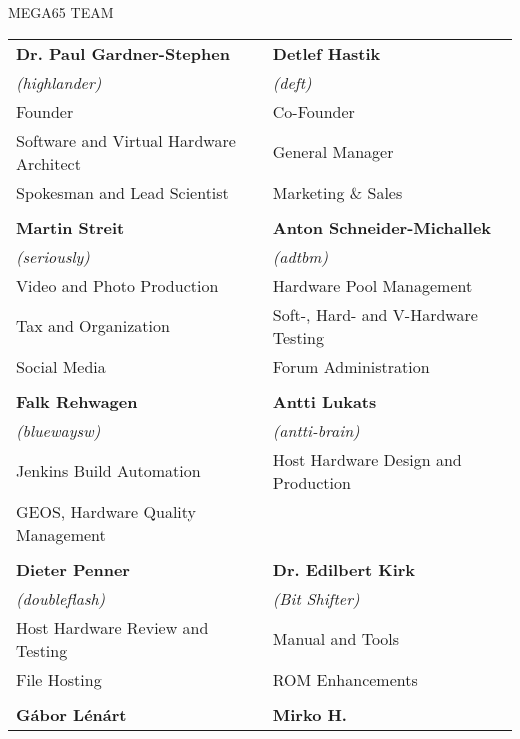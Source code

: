 \newpage
{\huge MEGA65 TEAM}\vspace{1cm}

\setlength{\tabcolsep}{1mm}
\begin{tabular}{ll}

{\large\bf Dr. Paul Gardner-Stephen}    & {\large\bf Detlef Hastik} \\
\textit{(highlander)}                   & \textit{(deft)} \\
Founder                                 & Co-Founder \\
Software and Virtual Hardware Architect & General Manager \\
Spokesman and Lead Scientist            & Marketing \& Sales \\
& \\
{\large\bf Martin Streit}               & {\large\bf Anton Schneider-Michallek} \\
 \textit{(seriously)}                   & \textit{(adtbm)} \\
Video and Photo Production              & Hardware Pool Management \\
Tax and Organization                    & Soft-, Hard- and V-Hardware Testing \\
Social Media                            & Forum Administration \\
& \\
{\large\bf Falk Rehwagen}               & {\large\bf Antti Lukats} \\
 \textit{(bluewaysw)}                   & \textit{(antti-brain)} \\
Jenkins Build Automation                & Host Hardware Design and Production \\
GEOS, Hardware Quality Management       & \\
& \\
{\large\bf Dieter Penner}               & {\large\bf Dr. Edilbert Kirk} \\
 \textit{(doubleflash)}                 & \textit{(Bit Shifter)} \\
Host Hardware Review and Testing        & Manual and Tools \\
File Hosting                            & ROM Enhancements \\
& \\
{\large\bf Gábor Lénárt}                & {\large\bf Mirko H.} \\

\end{tabular}
